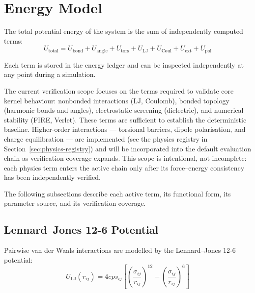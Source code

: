 \documentclass[11pt,twoside]{article}
\def\varepsilon{eps}%
\begin{document}
\section{Energy Model}
\label{sec:energy}

The total potential energy of the system is the sum of independently computed terms:
\begin{equation}
  U_{\mathrm{total}} = U_{\mathrm{bond}} + U_{\mathrm{angle}} + U_{\mathrm{tors}} + U_{\mathrm{LJ}} + U_{\mathrm{Coul}} + U_{\mathrm{ext}} + U_{\mathrm{pol}}
  \label{eq:Utotal}
\end{equation}

Each term is stored in the energy ledger and can be inspected independently at any point during a simulation.

The current verification scope focuses on the terms required to validate core kernel behaviour: nonbonded interactions (LJ, Coulomb), bonded topology (harmonic bonds and angles), electrostatic screening (dielectric), and numerical stability (FIRE, Verlet). These terms are sufficient to establish the deterministic baseline. Higher-order interactions --- torsional barriers, dipole polarisation, and charge equilibration --- are implemented (see the physics registry in Section~\ref{sec:physics-registry}) and will be incorporated into the default evaluation chain as verification coverage expands. This scope is intentional, not incomplete: each physics term enters the active chain only after its force--energy consistency has been independently verified.

The following subsections describe each active term, its functional form, its parameter source, and its verification coverage.

\subsection{Lennard--Jones 12-6 Potential}

Pairwise van der Waals interactions are modelled by the Lennard--Jones 12-6 potential:
\begin{equation}
  U_{\mathrm{LJ}}(r_{ij}) = 4\varepsilon_{ij} \left[
    \left(\frac{\sigma_{ij}}{r_{ij}}\right)^{12} -
    \left(\frac{\sigma_{ij}}{r_{ij}}\right)^{6}
  \right]
  \label{eq:LJ}
\end{equation}
\end{document}

